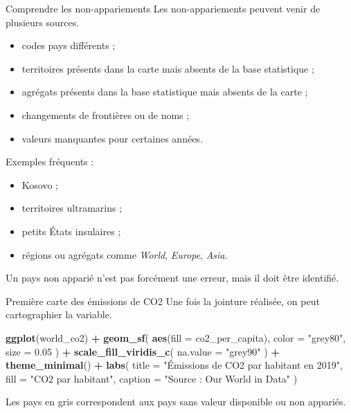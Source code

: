 \documentclass[
  10pt,
  ignorenonframetext,
]{beamer}
\newenvironment{Shaded}{\begin{snugshade}}{\end{snugshade}}
\newcommand{\AttributeTok}[1]{\textcolor[rgb]{0.13,0.29,0.53}{#1}}
\newcommand{\FloatTok}[1]{\textcolor[rgb]{0.00,0.00,0.81}{#1}}
\newcommand{\FunctionTok}[1]{\textcolor[rgb]{0.13,0.29,0.53}{\textbf{#1}}}
\newcommand{\NormalTok}[1]{#1}
\newcommand{\SpecialCharTok}[1]{\textcolor[rgb]{0.81,0.36,0.00}{\textbf{#1}}}
\newcommand{\StringTok}[1]{\textcolor[rgb]{0.31,0.60,0.02}{#1}}
\begin{document}
\begin{frame}{Comprendre les non-appariements}
\label{comprendre-les-non-appariements}
Les non-appariements peuvent venir de plusieurs sources.

\begin{itemize}
  \item codes pays différents ;
  \item territoires présents dans la carte mais absents de la base statistique ;
  \item agrégats présents dans la base statistique mais absents de la carte ;
  \item changements de frontières ou de noms ;
  \item valeurs manquantes pour certaines années.
\end{itemize}

Exemples fréquents :

\begin{itemize}
  \item Kosovo ;
  \item territoires ultramarins ;
  \item petits États insulaires ;
  \item régions ou agrégats comme \textit{World}, \textit{Europe}, \textit{Asia}.
\end{itemize}

Un pays non apparié n'est pas forcément une erreur, mais il doit être
identifié.
\end{frame}

\begin{frame}[fragile]{Première carte des émissions de CO2}
\label{premiuxe8re-carte-des-uxe9missions-de-co2}
Une fois la jointure réalisée, on peut cartographier la variable.

\begin{Shaded}
\begin{Highlighting}[]
\FunctionTok{ggplot}\NormalTok{(world\_co2) }\SpecialCharTok{+}
  \FunctionTok{geom\_sf}\NormalTok{(}
    \FunctionTok{aes}\NormalTok{(}\AttributeTok{fill =}\NormalTok{ co2\_per\_capita),}
    \AttributeTok{color =} \StringTok{"grey80"}\NormalTok{,}
    \AttributeTok{size =} \FloatTok{0.05}
\NormalTok{  ) }\SpecialCharTok{+}
  \FunctionTok{scale\_fill\_viridis\_c}\NormalTok{(}
    \AttributeTok{na.value =} \StringTok{"grey90"}
\NormalTok{  ) }\SpecialCharTok{+}
  \FunctionTok{theme\_minimal}\NormalTok{() }\SpecialCharTok{+}
  \FunctionTok{labs}\NormalTok{(}
    \AttributeTok{title =} \StringTok{"Émissions de CO2 par habitant en 2019"}\NormalTok{,}
    \AttributeTok{fill =} \StringTok{"CO2 par habitant"}\NormalTok{,}
    \AttributeTok{caption =} \StringTok{"Source : Our World in Data"}
\NormalTok{  )}
\end{Highlighting}
\end{Shaded}

Les pays en gris correspondent aux pays sans valeur disponible ou non
appariés.
\end{frame}
\end{document}
